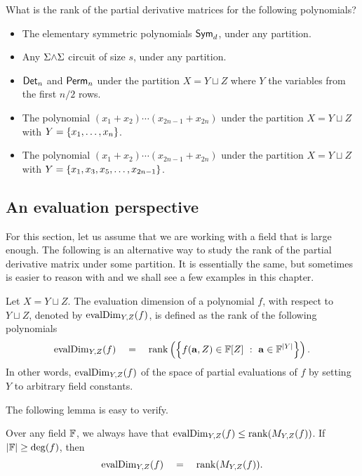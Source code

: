 \begin{exercise}\label{ex:pdm-rank}
What is the rank of the partial derivative matrices for the following polynomials? 
\begin{itemize}
\item The elementary symmetric polynomials $\operatorname{\mathsf{Sym}}_d$, under any partition.
\item Any $\Sigma\mathord{\wedge}\Sigma$ circuit of size $s$, under any partition.
\item $\operatorname{\mathsf{Det}}_n$ and $\operatorname{\mathsf{Perm}}_n$ under the partition $X = Y \sqcup Z$ where $Y$ the variables from the first $n/2$ rows. 
\item The polynomial $(x_1 + x_2) \cdots (x_{2n-1} + x_{2n})$ under the partition $X = Y \sqcup Z$ with $Y = \left\{x_1,\ldots, x_n\right\}$. 
\item The polynomial $(x_1 + x_2) \cdots (x_{2n-1} + x_{2n})$ under the partition $X = Y \sqcup Z$ with $Y = \left\{x_1,x_3,x_5,\ldots, x_{2n-1}\right\}$. 
\end{itemize}
\end{exercise}

\subsection{An evaluation perspective}

For this section, let us assume that we are working with a field that is large enough. The following is an alternative way to study the rank of the partial derivative matrix under some partition. It is essentially the same, but sometimes is easier to reason with and we shall see a few examples in this chapter. 

\begin{definition}
Let $X = Y \sqcup Z$. The evaluation dimension of a polynomial $f$, with respect to $Y \sqcup Z$, denoted by $\operatorname{evalDim}_{Y,Z}(f)$,  is defined as the rank of the following polynomials
\[
\operatorname{evalDim}_{Y,Z}(f) \quad = \quad \operatorname{rank}\left(\left\{{f(\mathbf{a}, Z) \in \mathbb{F}[Z]}\ : \ {\mathbf{a} \in \mathbb{F}^{|Y|}}\right\}\right). 
\]
In other words, $\operatorname{evalDim}_{Y,Z}(f)$ of the space of partial evaluations of $f$ by setting $Y$ to arbitrary field constants. 
\end{definition}

\noindent 
The following lemma is easy to verify.

\begin{lemma}\label{lem:evalDim-to-coeffDim}
Over any field $\mathbb{F}$, we always have that $\operatorname{evalDim}_{Y,Z}(f) \leq \operatorname{rank}(M_{Y,Z}(f))$. If $|\mathbb{F}| \geq \deg(f)$, then
\[
\operatorname{evalDim}_{Y,Z}(f) \quad = \quad \operatorname{rank}(M_{Y,Z}(f)).
\]
\end{lemma}

